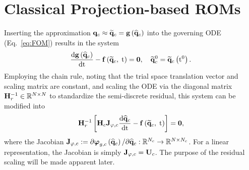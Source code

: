 \section{Classical Projection-based ROMs}\label{sec:classicROMs}

Inserting the approximation $\mathbf{q}_{c} \approx \mathbf{\widetilde{q}}_{c} = \mathbf{g} \left(\mathbf{\widehat{q}}_{c}\right)$ into the governing ODE (Eq.~\ref{eq:FOM}) results in the system
%
\begin{equation}\label{eq:romFullODE}
    \frac{\text{d} \mathbf{g} \left(\mathbf{\widehat{q}}_{c}\right)}{\text{d} \text{t}} - \mathbf{f} \left(\mathbf{\widetilde{q}}_{c}, \; \text{t}\right) = \mathbf{0}, \quad \mathbf{\widetilde{q}}_{c}^0 = \mathbf{\widetilde{q}}_{c} \left(\text{t}^0\right).
\end{equation}
%
Employing the chain rule, noting that the trial space translation vector and scaling matrix are constant, and scaling the ODE via the diagonal matrix $\resScaleInv \inRTwo{\numDOF}{\numDOF}$ to standardize the semi-discrete residual, this system can be modified into
%
\begin{equation}\label{eq:romFullODEMod}
    \resScaleInv \left[ \consScale \jacobTrialCons \ode{\consVecCoef}{\timeVar} - \rhsFunc{\consVecRom, \; \timeVar} \right] = \zeroVec,
\end{equation}
%
where the Jacobian $\mathbf{J}_{\varphi,c} := \partial \boldsymbol{\varphi}_{g, c}\left(\mathbf{\widehat{q}}_{c}\right) / \partial \mathbf{\widehat{q}}_{c}: \mathbb{R}^{N_c} \rightarrow \mathbb{R}^{N \times N_c}$. For a linear representation, the Jacobian is simply $\jacobTrialCons = \consTrial$. The purpose of the residual scaling will be made apparent later.


